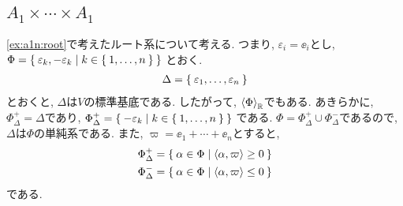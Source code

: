 \subsection{$A_{1}\times\cdots\times A_{1}$}
\label{ex:a1n:simple}
\cref{ex:a1n:root}で考えたルート系について考える.
つまり, $\varepsilon_i=\ee_i$とし,
$\Phi=\Set{\varepsilon_k,-\varepsilon_k|k\in\Set{1,\ldots,n}}$
とおく.
\begin{align*}
  \Delta=\Set{\varepsilon_1,\ldots,\varepsilon_n}
\end{align*}
とおくと, $\Delta$は$V$の標準基底である.
したがって, $\Braket{\Phi}_{\mathbb{R}}$でもある.
あきらかに, $\Phi_\Delta^+=\Delta$であり,
$\Phi_\Delta^+=\Set{-\varepsilon_k|k\in\Set{1,\ldots,n}}$
である.  
$\Phi=\Phi_\Delta^+\cup\Phi_\Delta^-$であるので,
$\Delta$は$\Phi$の単純系である.
また, $\varpi=\ee_1+\cdots+\ee_n$とすると,
\begin{align*}
\Phi_\Delta^+&=\Set{\alpha\in\Phi|\Braket{\alpha,\varpi}\geq 0}\\
\Phi_\Delta^-&=\Set{\alpha\in\Phi|\Braket{\alpha,\varpi}\leq 0}
\end{align*}
である.

